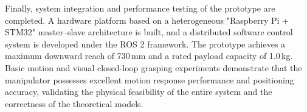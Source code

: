 {  Finally, system integration and performance testing of the prototype are completed. A hardware platform based on a heterogeneous "Raspberry Pi + STM32" master–slave architecture is built, and a distributed software control system is developed under the ROS 2 framework. The prototype achieves a maximum downward reach of 730 mm and a rated payload capacity of 1.0 kg. Basic motion and visual closed-loop grasping experiments demonstrate that the manipulator possesses excellent motion response performance and positioning accuracy, validating the physical feasibility of the entire system and the correctness of the theoretical models.
  }









\makecover
\clearpage
